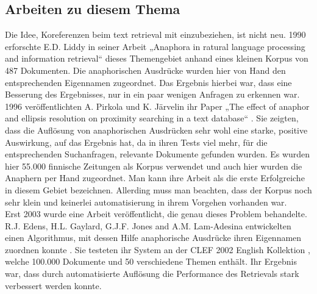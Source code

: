 \subsection{Arbeiten zu diesem Thema}

Die Idee, Koreferenzen beim text retrieval mit einzubeziehen, ist nicht neu. 1990 erforschte E.D. Liddy in seiner Arbeit „Anaphora in ratural language processing and information retrieval“ \cite{paper:Liddy} dieses Themengebiet anhand eines kleinen Korpus von 487 Dokumenten. Die anaphorischen Ausdrücke wurden hier von Hand den entsprechenden Eigennamen zugeordnet. Das Ergebnis hierbei war, dass eine Besserung des Ergebnisses, nur in ein paar wenigen Anfragen zu erkennen war.\\
1996 veröffentlichten A. Pirkola und K. Järvelin ihr Paper „The effect of anaphor and ellipsis resolution on proximity searching in a text database“ \cite{paper:Pirkola}. Sie zeigten, dass die Auflösung von anaphorischen Ausdrücken sehr wohl eine starke, positive Auswirkung, auf das Ergebnis hat, da in ihren Tests viel mehr, für die entsprechenden Suchanfragen, relevante Dokumente gefunden wurden. Es wurden hier 55.000 finnische Zeitungen als Korpus verwendet und auch hier wurden die Anaphern per Hand zugeordnet. Man kann ihre Arbeit als die erste Erfolgreiche in diesem Gebiet bezeichnen. Allerding muss man beachten, dass der Korpus noch sehr klein und keinerlei automatisierung in ihrem Vorgehen vorhanden war.\\
Erst 2003 wurde eine Arbeit veröffentlicht, die genau dieses Problem behandelte. R.J. Edens, H.L. Gaylard, G.J.F. Jones and A.M. Lam-Adesina entwickelten einen Algorithmus, mit dessen Hilfe anaphorische Ausdrücke ihren Eigennamen zuordnen konnte \cite{paper:Edens}. Sie testeten ihr System an der CLEF 2002 English Kollektion \cite{paper:Braschler}, welche 100.000 Dokumente und 50 verschiedene Themen enthält. Ihr Ergebnis war, dass durch automatisierte Auflösung die Performance des Retrievals stark verbessert werden konnte.
